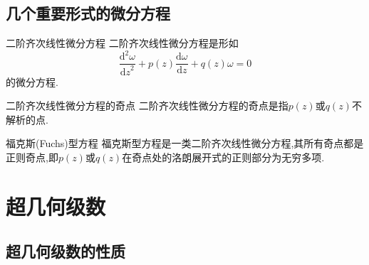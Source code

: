 \documentclass[zihao=-4,a4paper]{ctexart}
\begin{document}
\subsection{几个重要形式的微分方程}
\begin{mdefinition}{二阶齐次线性微分方程}
	二阶齐次线性微分方程是形如
	\begin{equation}
		\frac{ {\text{d}}^{2} {\omega}}{ { \text{d} {z} }^{2} } + {p} \left( {z} \right) \frac{ \text{d} {\omega} }{ \text{d} {z} } + {q} \left( {z} \right) {\omega} = 0
	\end{equation}
	的微分方程.
\end{mdefinition}
\begin{mdefinition}{二阶齐次线性微分方程的奇点}
	二阶齐次线性微分方程的奇点是指${p} \left( {z} \right)$或${q} \left( {z} \right)$不解析的点.
\end{mdefinition}
\begin{mdefinition}{福克斯(Fuchs)型方程}
	福克斯型方程是一类二阶齐次线性微分方程,其所有奇点都是正则奇点,即${p} \left( {z} \right)$或${q} \left( {z} \right)$在奇点处的洛朗展开式的正则部分为无穷多项.
\end{mdefinition}

\newpage

\section{超几何级数}

\subsection{超几何级数的性质}
\end{document}
